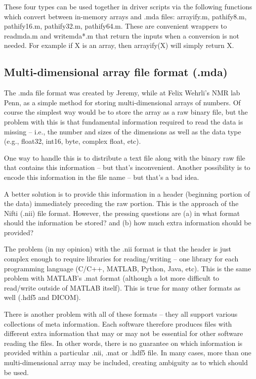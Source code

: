\documentclass{article}
\begin{document}
These four types can be used together in driver scripts via the following functions which convert between in-memory arrays and .mda files: arrayify.m, pathify8.m, pathify16.m, pathify32.m, pathify64.m. These are convenient wrappers to readmda.m and writemda*.m that return the inputs when a conversion is not needed. For example if X is an array, then arrayify(X) will simply return X.

\subsection{Multi-dimensional array file format (.mda)}

The .mda file format was created by Jeremy, while at Felix Wehrli's NMR lab Penn, as a simple method for storing multi-dimensional arrays of numbers. Of course the simplest way would be to store the array as a raw binary file, but the problem with this is that fundamental information required to read the data is missing – i.e., the number and sizes of the dimensions as well as the data type (e.g., float32, int16, byte, complex float, etc).

One way to handle this is to distribute a text file along with the binary raw file that contains this information – but that's inconvenient. Another possibility is to encode this information in the file name – but that's a bad idea.

A better solution is to provide this information in a header (beginning portion of the data) immediately preceding the raw portion. This is the approach of the Nifti (.nii) file format. However, the pressing questions are (a) in what format should the information be stored? and (b) how much extra information should be provided?

The problem (in my opinion) with the .nii format is that the header is just complex enough to require libraries for reading/writing – one library for each programming language (C/C++, MATLAB, Python, Java, etc). This is the same problem with MATLAB's .mat format (although a lot more difficult to read/write outside of MATLAB itself). This is true for many other formats as well (.hdf5 and DICOM).

There is another problem with all of these formats – they all support various collections of meta information. Each software therefore produces files with different extra information that may or may not be essential for other software reading the files. In other words, there is no guarantee on which information is provided within a particular .nii, .mat or .hdf5 file. In many cases, more than one multi-dimensional array may be included, creating ambiguity as to which should be used.
\end{document}

